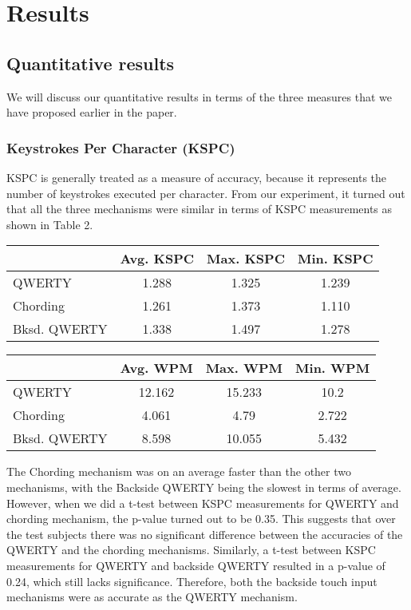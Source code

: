 \section{Results}
\subsection{Quantitative results}
We will discuss our quantitative results in terms of the three measures that we have proposed earlier in the paper. 
\subsubsection{Keystrokes Per Character (KSPC)}
KSPC is generally treated as a measure of accuracy, because it represents the number of keystrokes executed per character. From our experiment, it turned out that all the three mechanisms were similar in terms of KSPC measurements as shown in Table 2.
\begin{table*}
\begin{minipage}[b]{0.5\linewidth}
	\centering
		\begin{tabular}{|l|c|c|c|} \hline
		                         & Avg. KSPC & Max. KSPC & Min. KSPC \\ \hline
			 QWERTY & 1.288 & 1.325 & 1.239 \\ \hline
			 Chording & 1.261 & 1.373 & 1.110 \\ \hline
			 Bksd. QWERTY & 1.338 & 1.497 & 1.278 \\ \hline
		\end{tabular}
	\caption{KSPC Statistics}
	\label{tab:StatisticsForTextCorpora}
\end{minipage}	
\begin{minipage}[b]{0.5\linewidth}
	\centering
		\begin{tabular}{|l|c|c|c|} \hline
		                         & Avg. WPM & Max. WPM & Min. WPM \\ \hline
			 QWERTY & 12.162 & 15.233 & 10.2 \\ \hline
			 Chording & 4.061 & 4.79 & 2.722 \\ \hline
			 Bksd. QWERTY & 8.598 & 10.055 & 5.432 \\ \hline
		\end{tabular}
	\caption{WPM Statistics}
	\label{tab:StatisticsForTextCorpora}
\end{minipage}
\end{table*}
The Chording mechanism was on an average faster than the other two mechanisms, with the Backside QWERTY being the slowest in terms of average. However, when we did a t-test between KSPC measurements for QWERTY and chording mechanism, the p-value turned out to be 0.35. This suggests that over the test subjects there was no significant difference between the accuracies of the QWERTY and the chording mechanisms. Similarly, a t-test between KSPC measurements for QWERTY and backside QWERTY resulted in a p-value of 0.24, which still lacks significance. Therefore, both the backside touch input mechanisms were as accurate as the QWERTY mechanism. 
